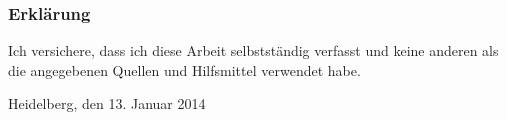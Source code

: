 
\subsubsection*{Erklärung}
\label{sub:Erklärung}

Ich versichere, dass ich diese Arbeit selbstständig verfasst und keine 
anderen als die angegebenen Quellen und Hilfsmittel verwendet habe.

\vspace{2\baselineskip}

Heidelberg, den 13. Januar 2014 \hspace{5em} \hrulefill

